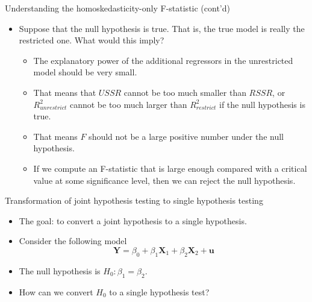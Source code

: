 \documentclass[presentation,10pt]{beamer}
\begin{document}
\begin{frame}[label={sec:orge06bb88}]{Understanding the homoskedasticity-only F-statistic (cont'd)}
\begin{itemize}
\item Suppose that the null hypothesis is true. That is, the
true model is really the restricted one. What would this imply?

\begin{itemize}
\item The explanatory power of the additional regressors in the
unrestricted model should be very small.

\vspace{0.2cm}

\item That means that \(USSR\) cannot be too much smaller than \(RSSR\), or
\(R^2_{unrestrict}\) cannot be too much larger than \(R^2_{restrict}\)
if the null hypothesis is true.

\vspace{0.2cm}

\item That means \(F\) should not be a large positive number under the null
hypothesis.

\vspace{0.2cm}

\item If we compute an F-statistic that is large enough compared with a
critical value at some significance level, then we can reject the
null hypothesis.
\end{itemize}
\end{itemize}
\end{frame}

\begin{frame}[label={sec:org26f71c2}]{Transformation of joint hypothesis testing to single hypothesis testing}
\begin{itemize}
\item The goal: to convert a joint hypothesis to a single hypothesis.

\item Consider the following model
\[ \mathbf{Y} = \beta_0 + \beta_1 \mathbf{X}_1 + \beta_2
  \mathbf{X}_2 + \mathbf{u} \]

\item The null hypothesis is \(H_0: \beta_1 = \beta_2\).

\item How can we convert \(H_0\) to a single hypothesis test?
\end{itemize}
\end{frame}
\end{document}
